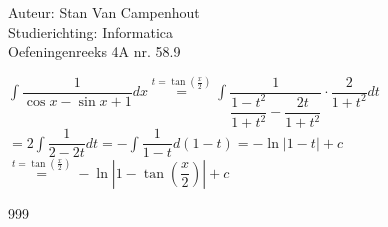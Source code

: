 \documentclass[a4paper]{article}
\begin{document}
  
\noindent \large Auteur: Stan Van Campenhout \\
\noindent \large Studierichting:  Informatica\\
\noindent \large Oefeningenreeks 4A nr. 58.9\\

\medskip

\normalsize

$ \displaystyle\int\dfrac{1}{\cos x-\sin x+1}dx \stackrel{t = \tan\left(\tfrac{x}{2}\right)}{=} \displaystyle\int\dfrac{1}{\dfrac{1-t^2}{1+t^2}-\dfrac{2t}{1+t^2}}\cdot\dfrac{2}{1+t^2}dt $\\

$ = 2 \displaystyle\int\dfrac{1}{2-2t}dt=-\displaystyle\int\dfrac{1}{1-t}d\left(1-t\right) = - \ln|1-t| + c $\\

$ \stackrel{t = \tan\left(\tfrac{x}{2}\right)}{=} -\ln\left|1 - \tan\left(\dfrac{x}{2}\right)\right| + c$\\

\begin{thebibliography}{999}
\end{thebibliography}
\end{document}
